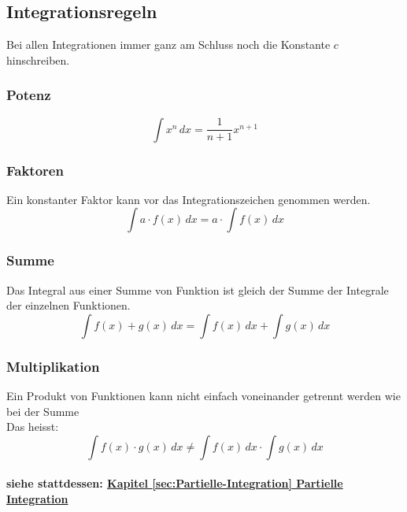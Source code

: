 \documentclass[12pt]{scrartcl}
\begin{document}
\newpage
\subsection{Integrationsregeln}\label{Integrationsregeln unb. Integrale}
Bei allen Integrationen immer ganz am Schluss noch die Konstante $c$ hinschreiben.

\subsubsection{Potenz}
\[\int x^n \, dx = \frac{1}{n + 1}x^{n + 1}\]

\subsubsection{Faktoren}
Ein konstanter Faktor kann vor das Integrationszeichen genommen werden.
\[\int a \cdot f(x) \, dx = a \cdot \int f(x) \, dx\]


\subsubsection{Summe}
Das Integral aus einer Summe von Funktion ist gleich der Summe der Integrale
der einzelnen Funktionen.
\[\int f(x) + g(x) \, dx = \int f(x)\, dx + \int g(x) \, dx\]

\subsubsection{Multiplikation}
Ein Produkt von Funktionen kann nicht einfach voneinander getrennt werden wie bei der Summe\\
Das heisst:\\
\[\int f(x) \cdot g(x) \, dx \neq \int f(x) \, dx \cdot \int g(x) \, dx\]
\vspace*{20px}\\
\textbf{siehe stattdessen: \hyperref[sec:Partielle-Integration]{Kapitel \ref{sec:Partielle-Integration} Partielle Integration}}

\newpage
\end{document}
